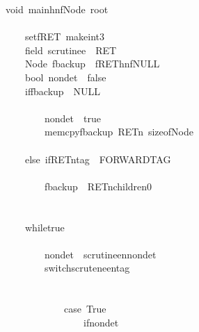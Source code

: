 \documentclass{book}
\theoremstyle{definition}
\begin{document}
\begin{figure}
\begin{tabbing}\ttfamily
~void~mainhnfNode~root\\
\ttfamily ~\\
\ttfamily ~~~~~setfRET~makeint3\\
\ttfamily ~~~~~field~scrutinee~~RET\\
\ttfamily ~~~~~Node~fbackup~~fREThnfNULL\\
\ttfamily ~~~~~bool~nondet~~false\\
\ttfamily ~~~~~iffbackup~~NULL\\
\ttfamily ~~~~~\\
\ttfamily ~~~~~~~~~nondet~~true\\
\ttfamily ~~~~~~~~~memcpyfbackup~RETn~sizeofNode\\
\ttfamily ~~~~~\\
\ttfamily ~~~~~else~ifRETntag~~FORWARDTAG\\
\ttfamily ~~~~~\\
\ttfamily ~~~~~~~~~fbackup~~RETnchildren0\\
\ttfamily ~~~~~\\
\ttfamily ~\\
\ttfamily ~~~~~whiletrue\\
\ttfamily ~~~~~\\
\ttfamily ~~~~~~~~~nondet~~scrutineennondet\\
\ttfamily ~~~~~~~~~switchscruteneentag\\
\ttfamily ~~~~~~~~~\\
\ttfamily ~~~~~~~~~~~~~\\
\ttfamily ~~~~~~~~~~~~~case~True\\
\ttfamily ~~~~~~~~~~~~~~~~~ifnondet\\
\ttfamily ~~~~~~~~~~~~~~~~~\\

\end{tabbing}
\end{figure}
\end{document}
